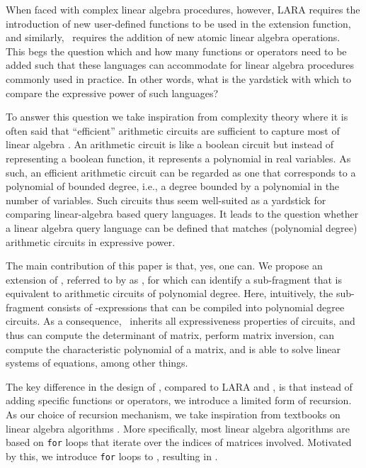 When faced with complex linear algebra procedures, however, LARA requires the introduction of new user-defined functions to be used in the extension function, and similarly, \lang\ requires the addition of new atomic linear algebra operations. This begs the question which and how many  functions or operators need to be added such that these languages can accommodate for 
linear algebra procedures commonly used in practice. In other words, what is the yardstick with which to compare the expressive power of such languages? 

To answer this question we take inspiration from complexity theory where it is often said that ``efficient'' arithmetic circuits are sufficient to capture most of linear algebra \cite{}. An arithmetic circuit is like a boolean circuit but instead of representing a boolean function, it represents a polynomial in real variables. As such, an efficient arithmetic circuit can be regarded as one that corresponds to a polynomial of bounded degree, i.e., a degree bounded by a polynomial in the number of variables. Such circuits thus seem well-suited as a yardstick for comparing  linear-algebra based query languages. It leads to the question whether a linear algebra query language can be defined that matches (polynomial degree) arithmetic circuits in expressive power.

The main contribution of this paper is that, yes, one can. We propose an extension of \lang, referred to by as \langfor, for which can identify a sub-fragment that is equivalent to arithmetic circuits of polynomial degree. Here, intuitively, the sub-fragment consists of \langfor-expressions that can be compiled into  polynomial degree circuits. As a consequence, \langfor\ inherits all expressiveness properties of circuits, and thus can compute the determinant of matrix, perform matrix inversion, can compute the characteristic polynomial of a matrix, and is able to solve linear systems of equations, among other things.

The key difference in the design of \langfor, compared to LARA and \lang, is that instead of adding specific functions or operators, we introduce a limited form of recursion. As our choice of recursion mechanism, we take inspiration from textbooks on linear algebra algorithms \cite{}. More specifically, most linear algebra algorithms are based on \texttt{for} loops that iterate over the indices of matrices involved. Motivated by this, we introduce \texttt{for} loops to \lang, resulting in \langfor. 

